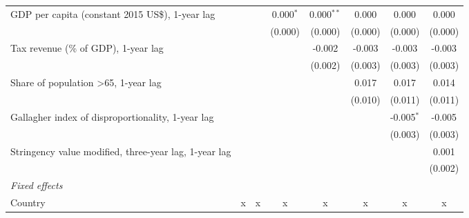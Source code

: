 \begin{tabular}{lccccccc}
   GDP per capita (constant 2015 US\$), 1-year lag                                   &              &              & 0.000$^{*}$   & 0.000$^{**}$  & 0.000          & 0.000          & 0.000\\   
                                                                                     &              &              & (0.000)       & (0.000)       & (0.000)        & (0.000)        & (0.000)\\   
   Tax revenue (\% of GDP), 1-year lag                                               &              &              &               & -0.002        & -0.003         & -0.003         & -0.003\\   
                                                                                     &              &              &               & (0.002)       & (0.003)        & (0.003)        & (0.003)\\   
   Share of population >65, 1-year lag                                               &              &              &               &               & 0.017          & 0.017          & 0.014\\   
                                                                                     &              &              &               &               & (0.010)        & (0.011)        & (0.011)\\   
   Gallagher index of disproportionality, 1-year lag                                 &              &              &               &               &                & -0.005$^{*}$   & -0.005\\   
                                                                                     &              &              &               &               &                & (0.003)        & (0.003)\\   
   Stringency value modified, three-year lag, 1-year lag                             &              &              &               &               &                &                & 0.001\\   
                                                                                     &              &              &               &               &                &                & (0.002)\\   
   \emph{Fixed effects}\\
   Country                                                                           & x            & x            & x             & x             & x              & x              & x\\  

\end{tabular}
